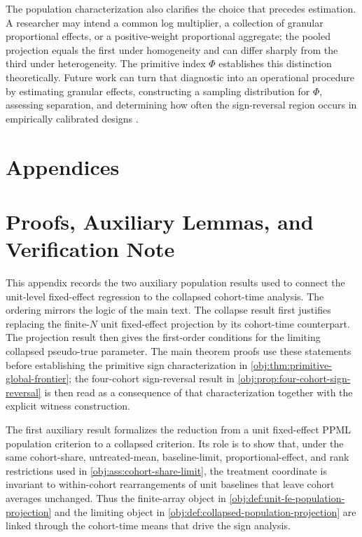 \documentclass[11pt]{article}
\begin{document}
The population characterization also clarifies the choice that precedes estimation. A researcher may intend a common log multiplier, a collection of granular proportional effects, or a positive-weight proportional aggregate; the pooled projection equals the first under homogeneity and can differ sharply from the third under heterogeneity. The primitive index \(\Phi\) establishes this distinction theoretically. Future work can turn that diagnostic into an operational procedure by estimating granular effects, constructing a sampling distribution for \(\Phi\), assessing separation, and determining how often the sign-reversal region occurs in empirically calibrated designs \citep{SantosSilvaTenreyro2006,SantosSilvaTenreyro2011,CorreiaGuimaraesZylkin2020,Wooldridge2023NonlinearDiD,NagengastYotov2025}.


\appendix

\section*{Appendices}

\section{Proofs, Auxiliary Lemmas, and Verification Note}

This appendix records the two auxiliary population results used to connect the unit-level fixed-effect regression to the collapsed cohort-time analysis. The ordering mirrors the logic of the main text. The collapse result first justifies replacing the finite-\(N\) unit fixed-effect projection by its cohort-time counterpart. The projection result then gives the first-order conditions for the limiting collapsed pseudo-true parameter. The main theorem proofs use these statements before establishing the primitive sign characterization in \cref{obj:thm:primitive-global-frontier}; the four-cohort sign-reversal result in \cref{obj:prop:four-cohort-sign-reversal} is then read as a consequence of that characterization together with the explicit witness construction.

The first auxiliary result formalizes the reduction from a unit fixed-effect PPML population criterion to a collapsed criterion. Its role is to show that, under the same cohort-share, untreated-mean, baseline-limit, proportional-effect, and rank restrictions used in \cref{obj:ass:cohort-share-limit}, the treatment coordinate is invariant to within-cohort rearrangements of unit baselines that leave cohort averages unchanged. Thus the finite-array object in \cref{obj:def:unit-fe-population-projection} and the limiting object in \cref{obj:def:collapsed-population-projection} are linked through the cohort-time means that drive the sign analysis.
\end{document}
